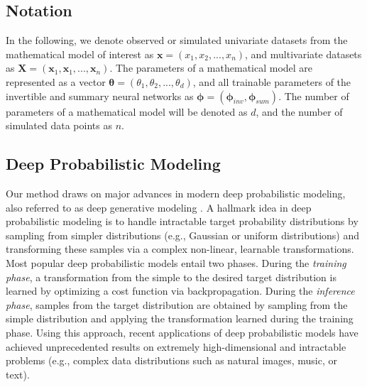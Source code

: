\documentclass[9pt,twoside,lineno]{pnas-new}
\begin{document}
\subsection*{Notation}

In the following, we denote observed or simulated univariate datasets from the mathematical model of interest as $\boldsymbol{x} = (x_{1}, x_{2},...,x_{n})$, and multivariate datasets as $\boldsymbol{X} = (\boldsymbol{x}_{1}, \boldsymbol{x}_{1},...,\boldsymbol{x}_{n})$. The parameters of a mathematical model are represented as a vector $\boldsymbol{\theta} = (\theta_{1}, \theta_{2},...,\theta_{d})$, and all trainable parameters of the invertible and summary neural networks as $\boldsymbol{\phi} = (\boldsymbol{\phi}_{inv}, \boldsymbol{\phi}_{sum})$. The number of parameters of a mathematical model will be denoted as $d$, and the number of simulated data points as $n$.

\subsection*{Deep Probabilistic Modeling}

Our method draws on major advances in modern deep probabilistic modeling, also referred to as deep generative modeling \cite{bloem2019probabilistic, kingma2018glow, ardizzone2018analyzing, kingma2014auto}. A hallmark idea in deep probabilistic modeling is to handle intractable target probability distributions by sampling from simpler distributions (e.g., Gaussian or uniform distributions) and transforming these samples via a complex non-linear, learnable transformations. Most popular deep probabilistic models entail two phases. During the \textit{training phase}, a transformation from the simple to the desired target distribution is learned by optimizing a cost function via backpropagation. During the \textit{inference phase}, samples from the target distribution are obtained by sampling from the simple distribution and applying the transformation learned during the training phase. Using this approach, recent applications of deep probabilistic models have achieved unprecedented results on extremely high-dimensional and intractable problems (e.g., complex data distributions such as natural images, music, or text).
\end{document}
